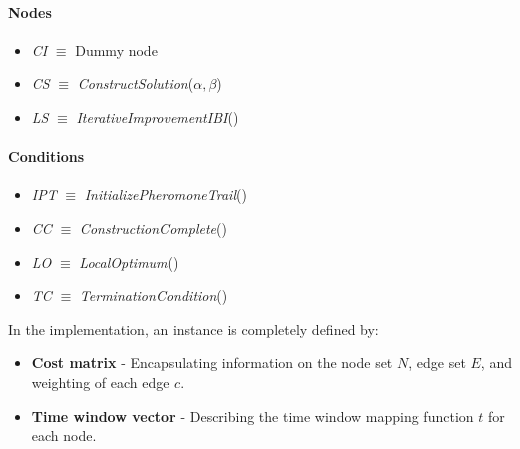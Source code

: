 \begin{homeworkProblem}
\begin{center}
\begin{minipage}{.45\textwidth}
\end{minipage}%
\hspace{1.5cm}
\begin{minipage}{.45\textwidth}
\centering
\paragraph{Nodes}
\begin{itemize}
  \item \emph{CI} $\equiv$ Dummy node
  \item \emph{CS} $\equiv$ \emph{ConstructSolution}($\alpha,\beta$)
  \item \emph{LS} $\equiv$ \emph{IterativeImprovementIBI}()
\end{itemize}
\paragraph{Conditions}
\begin{itemize}
  \item \emph{IPT} $\equiv$ \emph{InitializePheromoneTrail}()
  \item \emph{CC} $\equiv$ \emph{ConstructionComplete}()
  \item \emph{LO} $\equiv$ \emph{LocalOptimum}()
  \item \emph{TC} $\equiv$ \emph{TerminationCondition}()
\end{itemize}
\end{minipage}
\end{center}

\newpage
In the implementation, an instance is completely defined by:
\begin{itemize}
\item \textbf{Cost matrix} - Encapsulating information on the node set $N$, edge set $E$, and weighting of each edge $c$.
\item \textbf{Time window vector} - Describing the time window mapping function $t$ for each node.
\end{itemize}


\end{homeworkProblem}
